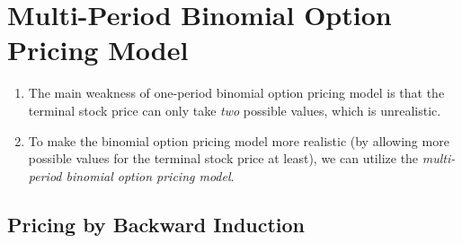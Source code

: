 \section{Multi-Period Binomial Option Pricing Model}
\label{sect:mult-period-binom}
\begin{enumerate}
\item The main weakness of one-period binomial option pricing model is that the
terminal stock price can only take \emph{two} possible values, which is
unrealistic.
\item To make the binomial option pricing model more realistic (by allowing
more possible values for the terminal stock price at least), we can utilize the
\emph{multi-period binomial option pricing model}.
\end{enumerate}
\subsection{Pricing by Backward Induction}
\label{subsect:back-induct-price}
